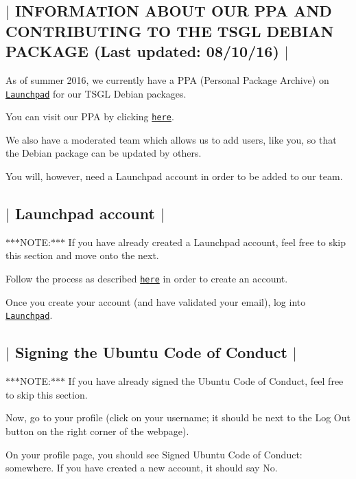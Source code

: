 

 \subsection*{$\vert$ I\-N\-F\-O\-R\-M\-A\-T\-I\-O\-N A\-B\-O\-U\-T O\-U\-R P\-P\-A A\-N\-D C\-O\-N\-T\-R\-I\-B\-U\-T\-I\-N\-G T\-O T\-H\-E T\-S\-G\-L D\-E\-B\-I\-A\-N P\-A\-C\-K\-A\-G\-E (Last updated\-: 08/10/16) $\vert$ }

As of summer 2016, we currently have a P\-P\-A (Personal Package Archive) on \href{https://launchpad.net/}{\tt Launchpad} for our T\-S\-G\-L Debian packages.

You can visit our P\-P\-A by clicking \href{https://launchpad.net/~tsgl-test/+archive/ubuntu/tsgl-dev}{\tt here}.

We also have a moderated team which allows us to add users, like you, so that the Debian package can be updated by others.

You will, however, need a Launchpad account in order to be added to our team. 

 \subsection*{$\vert$ Launchpad account $\vert$ }

$\ast$$\ast$$\ast$\-N\-O\-T\-E\-:$\ast$$\ast$$\ast$ If you have already created a Launchpad account, feel free to skip this section and move onto the next.

Follow the process as described \href{https://login.launchpad.net/+new_account}{\tt here} in order to create an account.

Once you create your account (and have validated your email), log into \href{https://launchpad.net/}{\tt Launchpad}. 

 \subsection*{$\vert$ Signing the Ubuntu Code of Conduct $\vert$ }

$\ast$$\ast$$\ast$\-N\-O\-T\-E\-:$\ast$$\ast$$\ast$ If you have already signed the Ubuntu Code of Conduct, feel free to skip this section.

Now, go to your profile (click on your username; it should be next to the {\ttfamily Log Out} button on the right corner of the webpage).

On your profile page, you should see {\ttfamily Signed Ubuntu Code of Conduct\-:} somewhere. If you have created a new account, it should say {\ttfamily No}.

